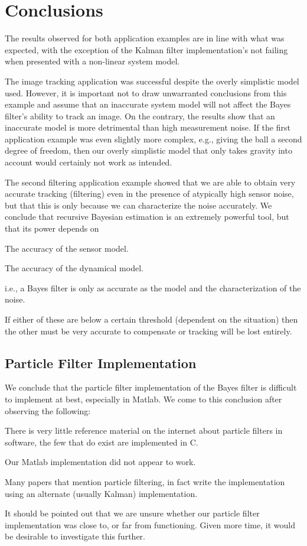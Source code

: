 \section{Conclusions}

The results observed for both application examples are in line with what was
expected, with the exception of the Kalman filter implementation's not failing
when presented with a non-linear system model.

The image tracking application was successful despite the overly simplistic 
model used. However, it is important not to draw unwarranted conclusions 
from this example and assume that an
inaccurate system model will not affect the Bayes filter's ability to track an
image. On the contrary, the results show that an inaccurate model is
more detrimental than high measurement noise. If the first application example 
was even slightly
more complex, e.g., giving the ball a second degree of freedom, then our
overly simplistic model that only takes gravity into account would certainly not
work as intended.

The second filtering application example showed that we are able to obtain very accurate tracking 
(filtering) even in the presence of atypically high sensor noise, but that this
is only because we can characterize the noise accurately. We conclude that 
recursive Bayesian estimation is an extremely powerful tool, but that its power
depends on
\begin{compactitem}
\item The accuracy of the sensor model.
\item The accuracy of the dynamical model.
\end{compactitem}
i.e., a Bayes filter is only as accurate as the model and the characterization 
of the noise.

If either of these are below a certain threshold (dependent on the situation) 
then the other must be very accurate to compensate or tracking will be lost
entirely.

\subsection{Particle Filter Implementation}
We conclude that the particle filter implementation of the Bayes filter is 
difficult to implement at best, especially in Matlab. We come to this conclusion
after observing the following:
\begin{compactitem}
\item There is very little reference material on the internet about particle filters
in software, the few that do exist are implemented in C.
\item Our Matlab implementation did not appear to work.
\item Many papers that mention particle filtering, in fact write the implementation
using an alternate (usually Kalman) implementation.
\end{compactitem}
It should be pointed out that we are unsure whether our particle filter implementation
was close to, or far from functioning. Given more time, it would be desirable to 
investigate this further.


